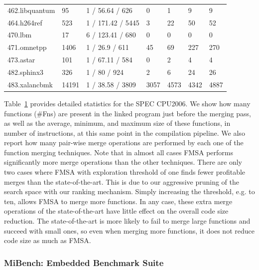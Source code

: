\begin{table}[h]
{\begin{tabular}{lllllll}
                     462.libquantum     & 95     & 1 / 56.64 / 626    & \small 0      & \small 1     & \small 9    & \small 9    \\
\rowcolor{evencolor} 464.h264ref        & 523    & 1 / 171.42 / 5445  & \small 3      & \small 22    & \small 50   & \small 52   \\
                     470.lbm            & 17     & 6 / 123.41 / 680   & \small 0      & \small 0     & \small 0    & \small 0    \\
\rowcolor{evencolor} 471.omnetpp        & 1406   & 1 / 26.9 / 611     & \small 45     & \small 69    & \small 227  & \small 270  \\
                     473.astar          & 101    & 1 / 67.11 / 584    & \small 0      & \small 2     & \small 4    & \small 4    \\
\rowcolor{evencolor} 482.sphinx3        & 326    & 1 / 80 / 924       & \small 2      & \small 6     & \small 24   & \small 26   \\
                     483.xalancbmk      & 14191  & 1 / 38.58 / 3809   & \small 3057   & \small 4573  & \small 4342 & \small 4887 \\
\bottomrule
\end{tabular}
}
\label{tab:stats}
\end{table}

Table~\ref{tab:stats} provides detailed statistics for the SPEC CPU2006.
We show how many functions (\#Fns) are present in the linked program
just before the merging pass, as well as
the average, minimum, and maximum size of these functions, in number of instructions, at
this same point in the compilation pipeline.
We also report how many pair-wise merge operations are
performed by each one of the function merging techniques.
Note that in almost all cases FMSA performs significantly more merge operations than the other
techniques.
There are only two cases where FMSA with exploration threshold of one finds fewer
profitable merges than the state-of-the-art. This is due to our aggressive pruning
of the search space with our ranking mechanism. Simply increasing the threshold, e.g. to ten,
allows FMSA to merge more functions. In any case, these extra merge operations of the state-of-the-art
have little effect on the overall code size reduction. The state-of-the-art is more likely to fail to
merge large functions and succeed with small ones, so even when merging more functions, it does not
reduce code size as much as FMSA.

\subsubsection*{MiBench: Embedded Benchmark Suite}

